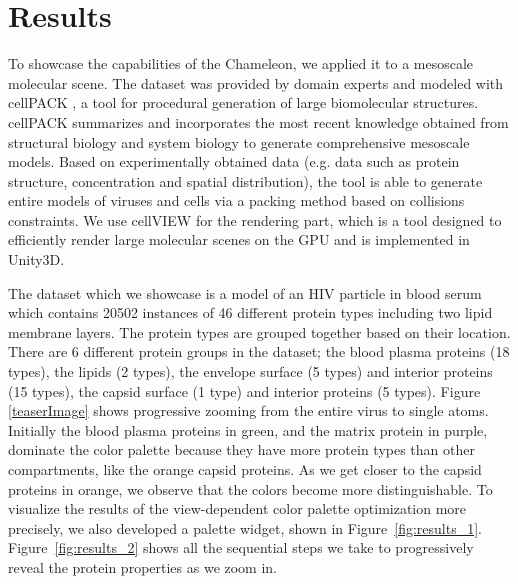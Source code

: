 \documentclass{egpubl}
\begin{document}
	
	
		
	\section{Results}
	\label{sec:results}
	
	To showcase the capabilities of the Chameleon, we applied it to a mesoscale molecular scene. 
	The dataset was provided by domain experts and modeled with cellPACK \cite{johnson2015cellpack}, a tool for procedural generation of large biomolecular structures.
	cellPACK summarizes and incorporates the most recent knowledge obtained from structural biology and system biology to generate comprehensive mesoscale models. 
	Based on experimentally obtained data (e.g. data such as protein structure, concentration and spatial distribution), the tool is able to generate entire models of viruses and cells via a packing method based on collisions constraints.
	We use cellVIEW \cite{muzic2015cellview} for the rendering part, which is a tool designed to efficiently render large molecular scenes on the GPU and is implemented in Unity3D. 
	
	The dataset which we showcase is a model of an HIV particle in blood serum which contains 20502 instances of 46 different protein types including two lipid membrane layers.
	The protein types are grouped together based on their location.
	There are 6 different protein groups in the dataset; the blood plasma proteins (18 types), the lipids (2 types), the envelope surface (5 types) and interior proteins (15 types), the capsid surface (1 type) and interior proteins (5 types).
	Figure \ref{teaserImage} shows progressive zooming from the entire virus to single atoms.	
	Initially the blood plasma proteins in green, and the matrix protein in purple, dominate the color palette because they have more protein types than other compartments, like the orange capsid proteins.	
	As we get closer to the capsid proteins in orange, we observe that the colors become more distinguishable.	
	To visualize the results of the view-dependent color palette optimization more precisely, we also developed a palette widget, shown in Figure~\ref{fig:results_1}.
	Figure~\ref{fig:results_2} shows all the sequential steps we take to progressively reveal the protein properties as we zoom in.
	
\end{document}
